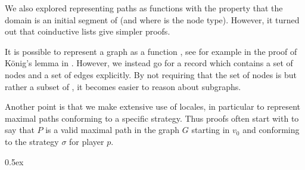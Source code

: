 \documentclass[11pt,a4paper]{scrartcl}
\begin{document}
We also explored representing paths as functions  with the property
that the domain is an initial segment of \isa{nat} (and where
 is the node type).  However, it turned out that
coinductive lists give simpler proofs.

It is possible to represent a graph as a function
, see for example in the proof of König's
lemma in \cite{Coinductive-AFP}.  However, we instead go for a record
which contains a set of nodes and a set of edges explicitly.  By not
requiring that the set of nodes is  but rather a subset of ,
it becomes easier to reason about subgraphs.

Another point is that we make extensive use of locales, in particular
to represent maximal paths conforming to a specific strategy.  Thus
proofs often start with  to say that $P$ is a valid maximal path in the graph
$G$ starting in $v_0$ and conforming to the strategy $\sigma$ for
player $p$.

\parindent 0pt\parskip 0.5ex



\clearpage
{}
{}


\end{document}
